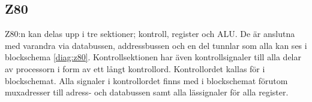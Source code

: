 \documentclass[main.tex]{subfiles}
\begin{document}
\subsection{Z80}
Z80:n kan delas upp i tre sektioner; kontroll, register och ALU. De är anslutna
med varandra via databussen, addressbussen och en del tunnlar som alla kan ses
i blockschema \ref{diag:z80}. Kontrollsektionen har även kontrollsignaler till
alla delar av processorn i form av ett långt kontrollord. Kontrollordet kallas
för  i blockschemat. Alla signaler i kontrollordet finns med i
blockschemat förutom muxadresser till adress- och databussen samt alla
lässignaler för alla register.





\newpage
\end{document}
